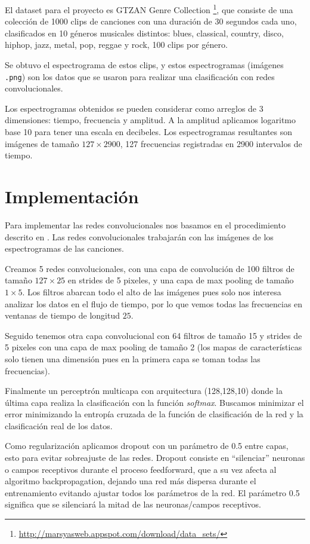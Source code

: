 \documentclass[spanish,11pt,letterpaper]{article}
\begin{document}
El dataset para el proyecto es \textsf{GTZAN Genre Collection}%
\footnote{\url{http://marsyasweb.appspot.com/download/data_sets/}}, que consiste de
una colección de 1000 clips de canciones con una duración de 30 segundos cada uno,
clasificados en 10 géneros musicales distintos: blues, classical, country, disco,
hiphop, jazz, metal, pop, reggae y rock, 100 clips por género.

Se obtuvo el espectrograma de estos clips, y estos espectrogramas (imágenes
\texttt{.png}) son los datos que se usaron para realizar una clasificación con
redes convolucionales.

Los espectrogramas obtenidos se pueden considerar como arreglos de 3 dimensiones: tiempo, frecuencia
y amplitud. A la amplitud aplicamos logaritmo base 10 para tener una escala en
decibeles. Los espectrogramas resultantes son imágenes de tamaño $127 \times 2900$,
127 frecuencias registradas en 2900 intervalos de tiempo.

\section{Implementación}

Para implementar las redes convolucionales nos basamos en el procedimiento descrito
en \cite{audio_recognition}. Las redes convolucionales trabajarán con las
imágenes de los espectrogramas de las canciones.

Creamos 5 redes convolucionales, con una capa de convolución de 100 filtros de
tamaño $127 \times 25$ en strides de 5 pixeles, y una capa de max pooling de tamaño
$1 \times 5$. Los filtros abarcan todo el alto de las imágenes pues solo
nos interesa analizar los datos en el flujo de tiempo, por lo que vemos todas
las frecuencias en ventanas de tiempo de longitud $25$.

Seguido tenemos otra capa convolucional con 64 filtros de tamaño 15 y strides de
5 pixeles con una capa de max pooling de tamaño 2 (los mapas de características
solo tienen una dimensión pues en la primera capa se toman todas las frecuencias).

Finalmente un perceptrón multicapa con arquitectura (128,128,10) donde la última
capa realiza la clasificación con la función \textit{softmax}. Buscamos minimizar
el error minimizando la entropía cruzada de la función de clasificación de la red
y la clasificación real de los datos.

Como regularización aplicamos dropout con un parámetro de 0.5 entre capas, esto
para evitar sobreajuste de las redes. Dropout consiste en ``silenciar'' neuronas
o campos receptivos durante el proceso feedforward, que a su vez afecta al
algoritmo backpropagation, dejando una red más dispersa durante el entrenamiento
evitando ajustar todos los parámetros de la red.
El parámetro 0.5 significa que se silenciará la mitad de las neuronas/campos
receptivos.
\end{document}
